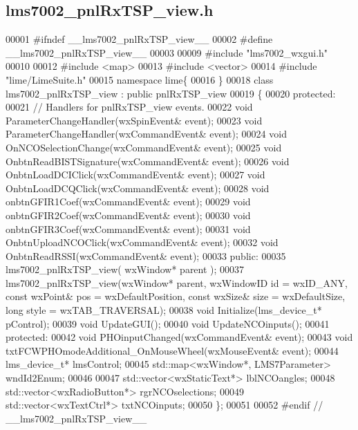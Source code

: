 \subsection{lms7002\+\_\+pnl\+Rx\+T\+S\+P\+\_\+view.\+h}
\label{lms7002__pnlRxTSP__view_8h_source}

\begin{DoxyCode}
00001 \textcolor{preprocessor}{#ifndef \_\_lms7002\_pnlRxTSP\_view\_\_}
00002 \textcolor{preprocessor}{#define \_\_lms7002\_pnlRxTSP\_view\_\_}
00003 
00009 \textcolor{preprocessor}{#include "lms7002_wxgui.h"}
00010 
00012 \textcolor{preprocessor}{#include <map>}
00013 \textcolor{preprocessor}{#include <vector>}
00014 \textcolor{preprocessor}{#include "lime/LimeSuite.h"}
00015 \textcolor{keyword}{namespace }lime\{
00016 \}
00018 \textcolor{keyword}{class }lms7002_pnlRxTSP_view : \textcolor{keyword}{public} pnlRxTSP_view
00019 \{
00020 \textcolor{keyword}{protected}:
00021     \textcolor{comment}{// Handlers for pnlRxTSP\_view events.}
00022     \textcolor{keywordtype}{void} ParameterChangeHandler(wxSpinEvent& event);
00023     \textcolor{keywordtype}{void} ParameterChangeHandler(wxCommandEvent& event);
00024     \textcolor{keywordtype}{void} OnNCOSelectionChange(wxCommandEvent& event);
00025     \textcolor{keywordtype}{void} OnbtnReadBISTSignature(wxCommandEvent& event);
00026     \textcolor{keywordtype}{void} OnbtnLoadDCIClick(wxCommandEvent& event);
00027     \textcolor{keywordtype}{void} OnbtnLoadDCQClick(wxCommandEvent& event);
00028     \textcolor{keywordtype}{void} onbtnGFIR1Coef(wxCommandEvent& event);
00029     \textcolor{keywordtype}{void} onbtnGFIR2Coef(wxCommandEvent& event);
00030     \textcolor{keywordtype}{void} onbtnGFIR3Coef(wxCommandEvent& event);
00031     \textcolor{keywordtype}{void} OnbtnUploadNCOClick(wxCommandEvent& event);
00032     \textcolor{keywordtype}{void} OnbtnReadRSSI(wxCommandEvent& event);
00033 \textcolor{keyword}{public}:
00035     lms7002_pnlRxTSP_view( wxWindow* parent );
00037     lms7002_pnlRxTSP_view(wxWindow* parent, wxWindowID \textcolor{keywordtype}{id} = wxID\_ANY, \textcolor{keyword}{const} wxPoint& pos = 
      wxDefaultPosition, \textcolor{keyword}{const} wxSize& size = wxDefaultSize, \textcolor{keywordtype}{long} style = wxTAB\_TRAVERSAL);
00038     \textcolor{keywordtype}{void} Initialize(lms_device_t* pControl);
00039     \textcolor{keywordtype}{void} UpdateGUI();
00040     \textcolor{keywordtype}{void} UpdateNCOinputs();
00041 \textcolor{keyword}{protected}:
00042     \textcolor{keywordtype}{void} PHOinputChanged(wxCommandEvent& event);
00043     \textcolor{keywordtype}{void} txtFCWPHOmodeAdditional\_OnMouseWheel(wxMouseEvent& event);
00044     lms_device_t* lmsControl;
00045     std::map<wxWindow*, LMS7Parameter> wndId2Enum;
00046 
00047     std::vector<wxStaticText*> lblNCOangles;
00048     std::vector<wxRadioButton*> rgrNCOselections;
00049     std::vector<wxTextCtrl*> txtNCOinputs;
00050 \};
00051 
00052 \textcolor{preprocessor}{#endif // \_\_lms7002\_pnlRxTSP\_view\_\_}
\end{DoxyCode}
